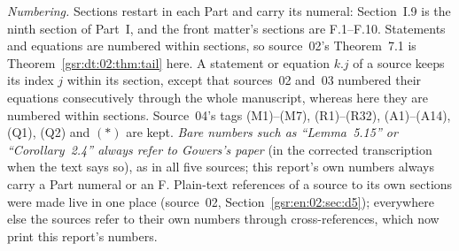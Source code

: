 \documentclass[11pt,letterpaper]{article}
\numberwithin{equation}{section}
\theoremstyle{definition}
\theoremstyle{remark}
\newcommand{\1}{\mathbf 1}
\begin{document}
\emph{Numbering.} Sections restart in each Part and carry its numeral: Section~I.9 is the ninth section of Part~I, and the front matter's sections are F.1--F.10. Statements and equations are numbered within sections, so source~02's Theorem~7.1 is Theorem~\ref{gsr:dt:02:thm:tail} here. A statement or equation $k.j$ of a source keeps its index $j$ within its section, except that sources~02 and~03 numbered their equations consecutively through the whole manuscript, whereas here they are numbered within sections. Source~04's tags (M1)--(M7), (R1)--(R32), (A1)--(A14), (Q1), (Q2) and $(\ast)$ are kept. \emph{Bare numbers such as ``Lemma~5.15'' or ``Corollary~2.4'' always refer to Gowers's paper} (in the corrected transcription when the text says so), as in all five sources; this report's own numbers always carry a Part numeral or an F. Plain-text references of a source to its own sections were made live in one place (source~02, Section~\ref{gsr:en:02:sec:d5}); everywhere else the sources refer to their own numbers through cross-references, which now print this report's numbers.
\end{document}
